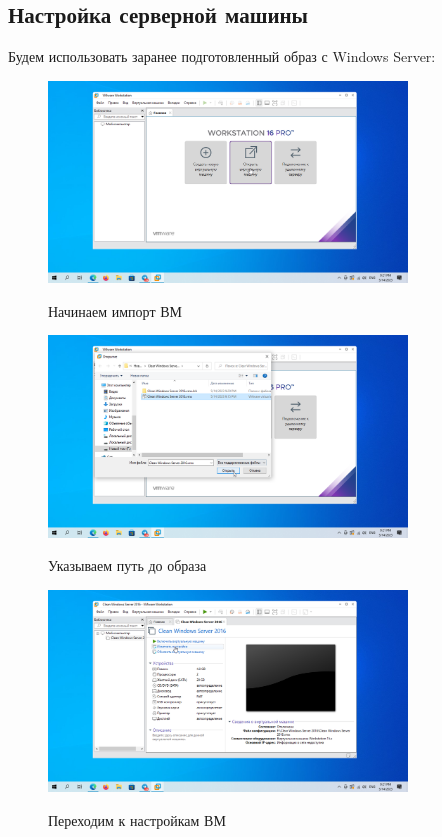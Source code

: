 \documentclass[a4paper]{article}
\begin{document}
  \subsection{Настройка серверной машины}

  Будем использовать заранее подготовленный образ с Windows Server:

  \begin{figure}[H]
    \centering
    \includegraphics[width=0.85\textwidth]{5_0007}
    \label{img:7}
    \caption{Начинаем импорт ВМ}
  \end{figure}

  \begin{figure}[H]
    \centering
    \includegraphics[width=0.85\textwidth]{5_0008}
    \label{img:8}
    \caption{Указываем путь до образа}
  \end{figure}

  \begin{figure}[H]
    \centering
    \includegraphics[width=0.85\textwidth]{5_0009}
    \label{img:9}
    \caption{Переходим к настройкам ВМ}
  \end{figure}
\end{document}
